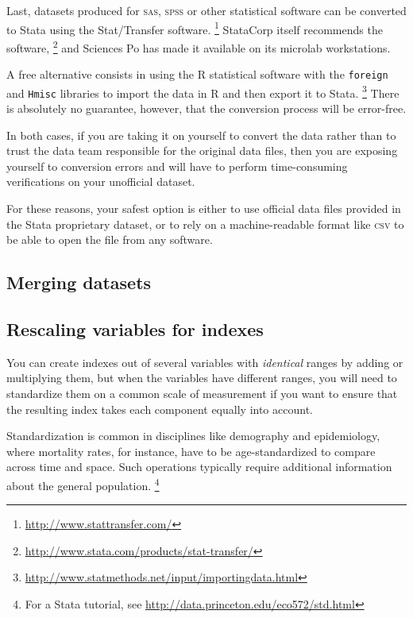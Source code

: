 
Last, datasets produced for \textsc{sas}, \textsc{spss} or other statistical software can be converted to Stata using the Stat/Transfer software.%
  \footnote{\url{http://www.stattransfer.com/}} %
StataCorp itself recommends the software,%
  \footnote{\url{http://www.stata.com/products/stat-transfer/}} %
and Sciences Po has made it available on its microlab workstations.

A free alternative consists in using the R statistical software with the \texttt{foreign} and \texttt{Hmisc} libraries to import the data in R and then export it to Stata.%
  \footnote{\url{http://www.statmethods.net/input/importingdata.html}} %
There is absolutely no guarantee, however, that the conversion process will be error-free.

In both cases, if you are taking it on yourself to convert the data rather than to trust the data team responsible for the original data files, then you are exposing yourself to conversion errors and will have to perform time-consuming verifications on your unofficial dataset.

For these reasons, your safest option is either to use official data files provided in the Stata proprietary dataset, or to rely on a machine-readable format like \textsc{csv} to be able to open the file from any software.

%
\subsection{Merging datasets}
\label{sec:merge}





%
\subsection{Rescaling variables for indexes}

You can create indexes out of several variables with \emph{identical} ranges by adding or multiplying them, but when the variables have different ranges, you will need to standardize them on a common scale of measurement if you want to ensure that the resulting index takes each component equally into account.

Standardization is common in disciplines like demography and epidemiology, where mortality rates, for instance, have to be age-standardized to compare across time and space. Such operations typically require additional information about the general population.%
  \footnote{For a Stata tutorial, see \url{http://data.princeton.edu/eco572/std.html}}

